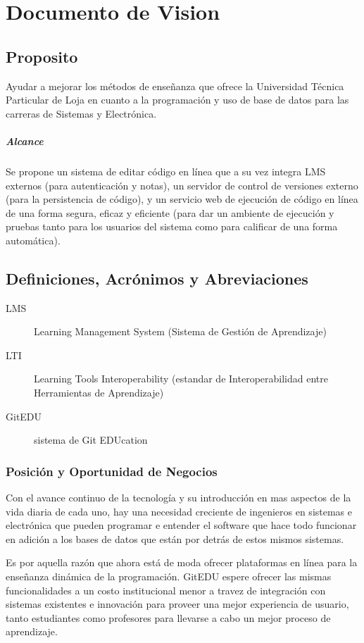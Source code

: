 

\chapter{Documento de Vision}
\label{visionDoc}

\section{Proposito}
Ayudar a mejorar los métodos de enseñanza que ofrece la Universidad Técnica Particular de Loja en cuanto a la programación y uso de base de datos para las carreras de Sistemas y Electrónica.
\paragraph{Alcance}
Se propone un sistema de editar código en línea que a su vez integra LMS externos (para autenticación y notas), un servidor de control de versiones externo (para la persistencia de código), y un servicio web de ejecución de código en línea de una forma segura, eficaz y eficiente (para dar un ambiente de ejecución y pruebas tanto para los usuarios del sistema como para calificar de una forma automática).
\section{Definiciones, Acrónimos y Abreviaciones}
\begin{description}
	\item[LMS] Learning Management System (Sistema de Gestión de Aprendizaje)
    \item[LTI] Learning Tools Interoperability (estandar de Interoperabilidad entre Herramientas de Aprendizaje)
    \item[GitEDU] sistema de Git EDUcation
\end{description}
\subsection{Posición y Oportunidad de Negocios}
Con el avance continuo de la tecnología y su introducción en mas aspectos de la vida diaria de cada uno, hay una necesidad creciente de ingenieros en sistemas e electrónica que pueden programar e entender el software que hace todo funcionar en adición a los bases de datos que están por detrás de estos mismos sistemas.
 
Es por aquella razón que ahora está de moda ofrecer plataformas en línea para la enseñanza dinámica de la programación. GitEDU espere ofrecer las mismas funcionalidades a un costo institucional menor a travez de integración con sistemas existentes e innovación para proveer una mejor experiencia de usuario, tanto estudiantes como profesores para llevarse a cabo un mejor proceso de aprendizaje.

